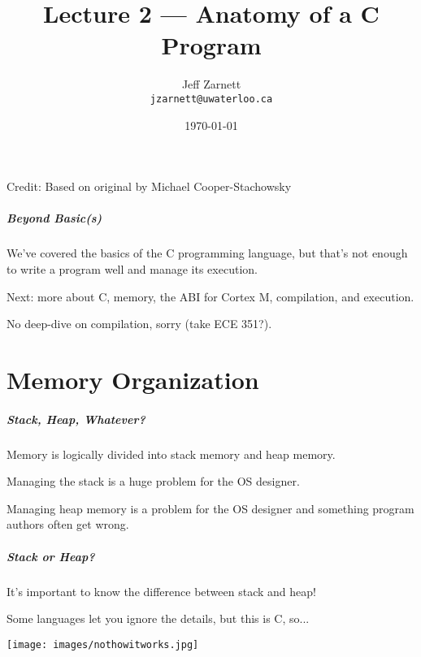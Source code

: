 

\title{Lecture 2 --- Anatomy of a C Program }

\author{Jeff Zarnett \\ \small \texttt{jzarnett@uwaterloo.ca}}
\date{\today}




\begin{frame}
  \titlepage

\small{Credit: Based on original by Michael Cooper-Stachowsky}

 \end{frame}

\begin{frame}
\frametitle{Beyond Basic(s)}

We've covered the basics of the C programming language, but that's not enough to write a program well and manage its execution.

Next: more about C, memory, the ABI for Cortex M, compilation, and execution.

No deep-dive on compilation, sorry (take ECE 351?).

\end{frame}

\part{Memory Organization}

\begin{frame}
\partpage
\end{frame}

\begin{frame}
\frametitle{Stack, Heap, Whatever?}

Memory is logically divided into stack memory and heap memory.

Managing the stack is a huge problem for the OS designer.

Managing heap memory is a problem for the OS designer and something program authors often get wrong.

\end{frame}

\begin{frame}
\frametitle{Stack or Heap?}

It's important to know the difference between stack and heap!

Some languages let you ignore the details, but this is C, so...

\begin{center}
  \texttt{[image: images/nothowitworks.jpg]}
\end{center}

\end{frame}


